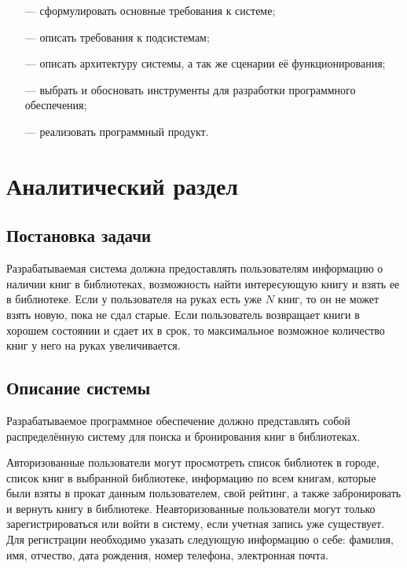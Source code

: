 \documentclass[a4paper, 12pt]{article}
\begin{document}
\begin{large}
\begin{itemize}
    \item[---] сформулировать основные требования к системе;
    \item[---] описать требования к подсистемам;
    \item[---] описать архитектуру системы, а так же сценарии её функционирования;
    \item[---] выбрать и обосновать инструменты для разработки программного обеспечения;
    \item[---] реализовать программный продукт.
\end{itemize}

\newpage
\titleformat{\section}[block]
{\bfseries\large\filright}{\thesection}{1em}{}
\section{Аналитический раздел}
\subsection{Постановка задачи}
Разрабатываемая система должна предоставлять пользователям информацию о наличии книг в библиотеках, возможность найти интересующую книгу и взять ее в библиотеке.
Если у пользователя на руках есть уже $N$ книг, то он не может взять новую, пока не сдал старые. 
Если пользователь возвращает книги в хорошем состоянии и сдает их в срок, то максимальное возможное количество книг у него на руках увеличивается.

\subsection{Описание системы}
Разрабатываемое программное обеспечение должно представлять собой распределённую систему для поиска и бронирования книг в библиотеках.

Авторизованные пользователи могут просмотреть список библиотек в городе, список книг в выбранной библиотеке, информацию по всем книгам, которые были взяты в прокат данным пользователем, свой рейтинг, а также забронировать и вернуть книгу в библиотеке. 
Неавторизованные пользователи могут только зарегистрироваться или войти в систему, если учетная запись уже существует.
Для регистрации необходимо указать следующую информацию о себе: фамилия, имя, отчество, дата рождения, номер телефона, электронная почта.



\end{large}
\end{document}
